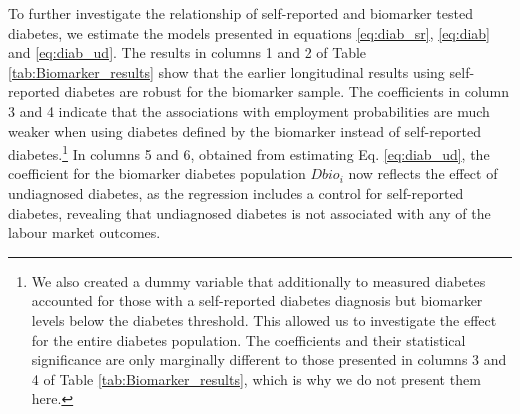 To further investigate the relationship of self-reported and biomarker tested diabetes, we estimate the models presented in equations \ref{eq:diab_sr}, \ref{eq:diab} and \ref{eq:diab_ud}.  
The results in columns 1 and 2 of Table \ref{tab:Biomarker_results} show that the earlier longitudinal results using self-reported diabetes are robust for the biomarker sample. The coefficients in column 3 and 4 indicate that the associations with employment probabilities are much weaker when using diabetes defined by the biomarker instead of self-reported diabetes.\footnote{We also created a dummy variable that additionally to measured diabetes accounted for those with a self-reported diabetes diagnosis but biomarker levels below the diabetes threshold. This allowed us to investigate the effect for the entire diabetes population. The coefficients and their statistical significance are only marginally different to those presented in columns 3 and 4 of Table \ref{tab:Biomarker_results}, which is why we do not present them here.} In columns 5 and 6, obtained from estimating Eq. \ref{eq:diab_ud}, the coefficient for the biomarker diabetes population $Dbio_i$ now reflects the effect of undiagnosed diabetes, as the regression includes a control for self-reported diabetes, revealing that undiagnosed diabetes is not associated with any of the labour market outcomes. 

